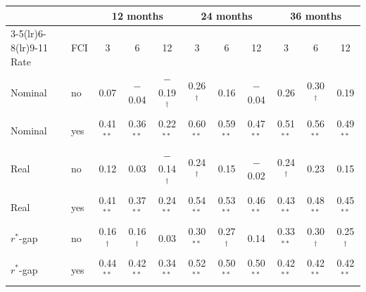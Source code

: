 \begin{tabular}{llccccccccc}
\toprule
 & & \multicolumn{3}{c}{12 months} & \multicolumn{3}{c}{24 months} & \multicolumn{3}{c}{36 months}\\
\cmidrule(lr){3-5}\cmidrule(lr){6-8}\cmidrule(lr){9-11}
Rate & FCI & 3 & 6 & 12 & 3 & 6 & 12 & 3 & 6 & 12 \\
\midrule
Nominal & no & 0.07 & $-$0.04 & $-$0.19$^{\dagger}$ & 0.26$^{\dagger}$ & 0.16 & $-$0.04 & 0.26 & 0.30$^{\dagger}$ & 0.19 \\
Nominal & yes & 0.41$^{**}$ & 0.36$^{**}$ & 0.22$^{**}$ & 0.60$^{**}$ & 0.59$^{**}$ & 0.47$^{**}$ & 0.51$^{**}$ & 0.56$^{**}$ & 0.49$^{**}$ \\
\midrule
Real & no & 0.12 & 0.03 & $-$0.14$^{\dagger}$ & 0.24$^{\dagger}$ & 0.15 & $-$0.02 & 0.24$^{\dagger}$ & 0.23 & 0.15 \\
Real & yes & 0.41$^{**}$ & 0.37$^{**}$ & 0.24$^{**}$ & 0.54$^{**}$ & 0.53$^{**}$ & 0.46$^{**}$ & 0.43$^{**}$ & 0.48$^{**}$ & 0.45$^{**}$ \\
\midrule
$r^*$-gap & no & 0.16$^{\dagger}$ & 0.16$^{\dagger}$ & 0.03 & 0.30$^{**}$ & 0.27$^{\dagger}$ & 0.14 & 0.33$^{**}$ & 0.30$^{\dagger}$ & 0.25$^{\dagger}$ \\
$r^*$-gap & yes & 0.44$^{**}$ & 0.42$^{**}$ & 0.34$^{**}$ & 0.52$^{**}$ & 0.50$^{**}$ & 0.50$^{**}$ & 0.42$^{**}$ & 0.42$^{**}$ & 0.42$^{**}$ \\
\bottomrule
\end{tabular}
